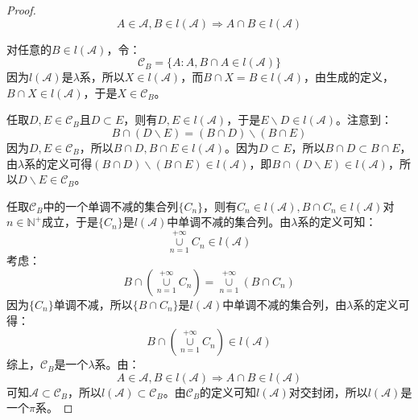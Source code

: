 \begin{proof}
	\begin{equation*}
		A\in \mathscr{A},B\in l(\mathscr{A})\Rightarrow A\cap B\in l(\mathscr{A})
	\end{equation*}\par
	对任意的$B\in l(\mathscr{A})$，令：
	\begin{equation*}
		\mathscr{C}_B=\{A:A,B\cap A\in l(\mathscr{A})\}
	\end{equation*}
	因为$l(\mathscr{A})$是$\lambda$系，所以$X\in l(\mathscr{A})$，而$B\cap X=B\in l(\mathscr{A})$，由生成的定义，$B\cap X\in l(\mathscr{A})$，于是$X\in \mathscr{C}_B$。\par
	任取$D,E\in \mathscr{C}_B$且$D\subset E$，则有$D,E\in l(\mathscr{A})$，于是$E\backslash D\in l(\mathscr{A})$。注意到：
	\begin{equation*}
		B\cap(D\backslash E)=(B\cap D)\backslash(B\cap E)
	\end{equation*}
	因为$D,E\in \mathscr{C}_B$，所以$B\cap D,B\cap E\in l(\mathscr{A})$。因为$D\subset E$，所以$B\cap D\subset B\cap E$，由$\lambda$系的定义可得$(B\cap D)\backslash(B\cap E)\in l(\mathscr{A})$，即$B\cap(D\backslash E)\in l(\mathscr{A})$，所以$D\backslash E\in \mathscr{C}_B$。\par
	任取$\mathscr{C}_B$中的一个单调不减的集合列$\{C_n\}$，则有$C_n\in l(\mathscr{A}),B\cap C_n\in l(\mathscr{A})$对$n\in\mathbb{N}^+$成立，于是$\{C_n\}$是$l(\mathscr{A})$中单调不减的集合列。由$\lambda$系的定义可知：
	\begin{equation*}
		\underset{n=1}{\overset{+\infty}{\cup}}C_n\in l(\mathscr{A})
	\end{equation*}
	考虑：
	\begin{equation*}
		B\cap\left(\underset{n=1}{\overset{+\infty}{\cup}}C_n\right)
		=\underset{n=1}{\overset{+\infty}{\cup}}(B\cap C_n)
	\end{equation*}
	因为$\{C_n\}$单调不减，所以$\{B\cap C_n\}$是$l(\mathscr{A})$中单调不减的集合列，由$\lambda$系的定义可得：
	\begin{equation*}
		B\cap\left(\underset{n=1}{\overset{+\infty}{\cup}}C_n\right)\in l(\mathscr{A})
	\end{equation*}
	综上，$\mathscr{C}_B$是一个$\lambda$系。由：
	\begin{equation*}
		A\in \mathscr{A},B\in l(\mathscr{A})\Rightarrow A\cap B\in l(\mathscr{A})
	\end{equation*}
	可知$\mathscr{A}\subset\mathscr{C}_B$，所以$l(\mathscr{A})\subset \mathscr{C}_B$。由$\mathscr{C}_B$的定义可知$l(\mathscr{A})$对交封闭，所以$l(\mathscr{A})$是一个$\pi$系。
\end{proof}
